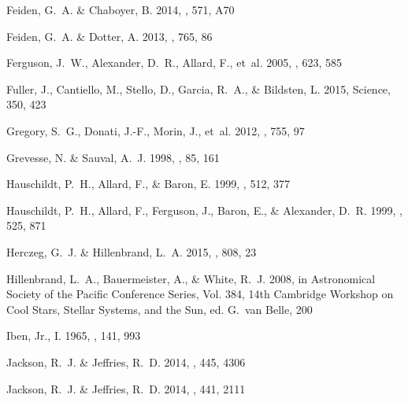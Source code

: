 \documentclass{aa}
\begin{document}
\begin{thebibliography}{71}
{Feiden}, G.~A. \& {Chaboyer}, B. 2014{}, \aap, 571, A70

{Feiden}, G.~A. \& {Dotter}, A. 2013, \apj, 765, 86

{Ferguson}, J.~W., {Alexander}, D.~R., {Allard}, F., {et~al.} 2005, \apj, 623,
  585

Fuller, J., Cantiello, M., Stello, D., Garcia, R.~A., \& Bildsten, L. 2015,
  Science, 350, 423

{Gregory}, S.~G., {Donati}, J.-F., {Morin}, J., {et~al.} 2012, \apj, 755, 97

{Grevesse}, N. \& {Sauval}, A.~J. 1998, \ssr, 85, 161

{Hauschildt}, P.~H., {Allard}, F., \& {Baron}, E. 1999{}, \apj,
  512, 377

{Hauschildt}, P.~H., {Allard}, F., {Ferguson}, J., {Baron}, E., \& {Alexander},
  D.~R. 1999{}, \apj, 525, 871

{Herczeg}, G.~J. \& {Hillenbrand}, L.~A. 2015, \apj, 808, 23

{Hillenbrand}, L.~A., {Bauermeister}, A., \& {White}, R.~J. 2008, in
  Astronomical Society of the Pacific Conference Series, Vol. 384, 14th
  Cambridge Workshop on Cool Stars, Stellar Systems, and the Sun, ed. G.~{van
  Belle}, 200

{Iben}, Jr., I. 1965, \apj, 141, 993

{Jackson}, R.~J. \& {Jeffries}, R.~D. 2014{}, \mnras, 445, 4306

{Jackson}, R.~J. \& {Jeffries}, R.~D. 2014{}, \mnras, 441, 2111


\end{thebibliography}
\end{document}
